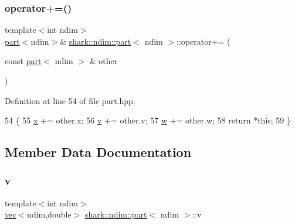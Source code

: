 \subsubsection{\texorpdfstring{operator+=()}{operator+=()}}
{\footnotesize\ttfamily template$<$int ndim$>$ \\
\hyperlink{structshark_1_1ndim_1_1part}{part}$<$ndim$>$\& \hyperlink{structshark_1_1ndim_1_1part}{shark\+::ndim\+::part}$<$ ndim $>$\+::operator+= (\begin{DoxyParamCaption}\item[{const \hyperlink{structshark_1_1ndim_1_1part}{part}$<$ ndim $>$ \&}]{other }\end{DoxyParamCaption})\hspace{0.3cm}{\ttfamily [inline]}}



Definition at line 54 of file part.\+hpp.


\begin{DoxyCode}
54                                                                                \{
55                                 \hyperlink{structshark_1_1ndim_1_1part_a8683feb6fd18c499f11f72dcdd3b7c1a}{x} += other.x;
56                                 \hyperlink{structshark_1_1ndim_1_1part_a985d6b06c78b3d33e080d2610ca4e3da}{v} += other.v;
57                                 \hyperlink{structshark_1_1ndim_1_1part_a030c3103f8272c8119666a818b99c513}{w} += other.w;
58                                 \textcolor{keywordflow}{return} *\textcolor{keyword}{this};
59                         \}
\end{DoxyCode}


\subsection{Member Data Documentation}
\hypertarget{structshark_1_1ndim_1_1part_a985d6b06c78b3d33e080d2610ca4e3da}{}\label{structshark_1_1ndim_1_1part_a985d6b06c78b3d33e080d2610ca4e3da} 
\subsubsection{\texorpdfstring{v}{v}}
{\footnotesize\ttfamily template$<$int ndim$>$ \\
\hyperlink{structshark_1_1ndim_1_1vec}{vec}$<$ndim,double$>$ \hyperlink{structshark_1_1ndim_1_1part}{shark\+::ndim\+::part}$<$ ndim $>$\+::v}



